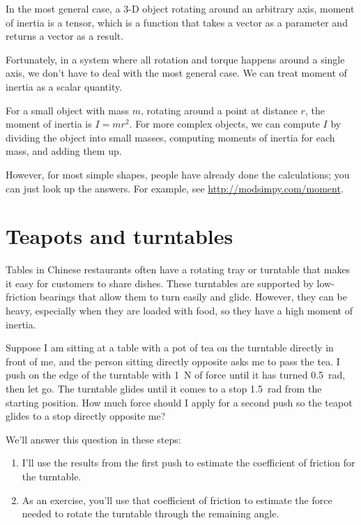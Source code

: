 \documentclass[12pt]{book}
\theoremstyle{exercise}
\begin{document}

In the most general case, a 3-D object rotating around an arbitrary axis, moment of inertia is a tensor, which is a function that takes a vector as a parameter and returns a vector as a result.


Fortunately, in a system where all rotation and torque happens around a single axis, we don't have to deal with the most general case.  We can treat moment of inertia as a scalar quantity.


For a small object with mass $m$, rotating around a point at distance $r$, the moment of inertia is $I = m r^2$.  For more complex objects, we can compute $I$ by dividing the object into small masses, computing moments of inertia for each mass, and adding them up.

However, for most simple shapes, people have already done the calculations; you can just look up the answers.  For example, see \url{http://modsimpy.com/moment}.


\section{Teapots and turntables}

Tables in Chinese restaurants often have a rotating tray or turntable
that makes it easy for customers to share dishes. These turntables are
supported by low-friction bearings that allow them to turn easily and
glide. However, they can be heavy, especially when they are loaded with
food, so they have a high moment of inertia.


Suppose I am sitting at a table with a pot of tea on the turntable
directly in front of me, and the person sitting directly opposite asks
me to pass the tea. I push on the edge of the turntable with \SI{1}{\newton} of force until it has turned \SI{0.5}{\radian}, then let go. The turntable glides until it comes to a stop \SI{1.5}{\radian} from the starting position. How much force should I apply for a second push so the teapot glides to a
stop directly opposite me?


We'll answer this question in these steps:

\begin{enumerate}

\item
  I'll use the results from the first push to estimate the coefficient
  of friction for the turntable.

\item
  As an exercise, you'll use that coefficient of friction to estimate the force needed to rotate the turntable through the remaining angle.

\end{enumerate}
\end{document}
